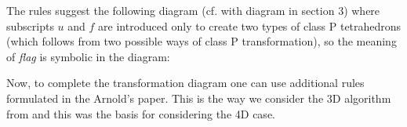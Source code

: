 \documentclass[a4paper,12pt]{amsart}
\numberwithin{equation}{section}
\begin{document}
The rules suggest the following diagram (cf. with diagram in section 3) where subscripts $u$ and $f$ are introduced only to create two types of class P tetrahedrons (which follows from two possible ways of class P transformation), so the meaning of \textit{flag} is symbolic in the diagram:

\begin{center}
\end{center}

Now, to complete the transformation diagram one can use additional rules formulated in the Arnold's paper. This is the way we consider the 3D algorithm from \cite{arnold} and this was the basis for considering the 4D case.
\end{document}
